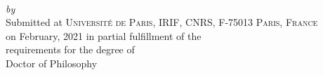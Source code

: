 
\begin{titlepage}
  \vspace*{5cm}
  \makeatletter
  \begin{center}
    \begin{Huge}
      \@title
    \end{Huge}\\[0.1cm]
    \emph{by}\\
    \@author
    \vfill
    Submitted at \textsc{Université de Paris, IRIF, CNRS, F-75013 Paris, France}\\
    on February, 2021 in partial fulfillment of the\\
    requirements for the degree of\\
    Doctor of Philosophy
  \end{center}
  \makeatother
\end{titlepage}

\newpage
\null
\thispagestyle{empty}
\newpage
